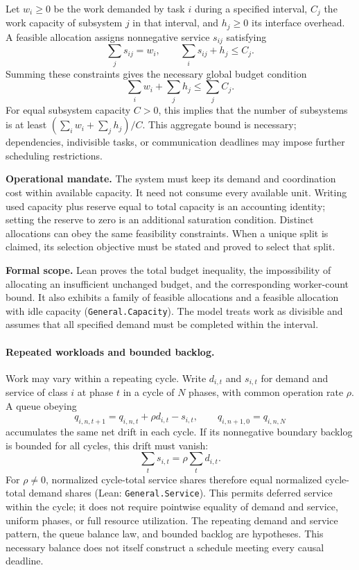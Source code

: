 Let $w_i\geq0$ be the work demanded by task $i$ during a specified interval, $C_j$ the work capacity of subsystem $j$ in that interval, and $h_j\geq0$ its interface overhead. A feasible allocation assigns nonnegative service $s_{ij}$ satisfying
\begin{equation}
    \sum_j s_{ij}=w_i,
    \qquad
    \sum_i s_{ij}+h_j\leq C_j.
\end{equation}
Summing these constraints gives the necessary global budget condition
\begin{equation}
    \sum_i w_i+\sum_j h_j\leq\sum_j C_j.
\end{equation}
For equal subsystem capacity $C>0$, this implies that the number of subsystems is at least $(\sum_iw_i+\sum_jh_j)/C$. This aggregate bound is necessary; dependencies, indivisible tasks, or communication deadlines may impose further scheduling restrictions.

\textbf{Operational mandate.} The system must keep its demand and coordination cost within available capacity. It need not consume every available unit. Writing used capacity plus reserve equal to total capacity is an accounting identity; setting the reserve to zero is an additional saturation condition. Distinct allocations can obey the same feasibility constraints. When a unique split is claimed, its selection objective must be stated and proved to select that split.

\textbf{Formal scope.} Lean proves the total budget inequality, the impossibility of allocating an insufficient unchanged budget, and the corresponding worker-count bound. It also exhibits a family of feasible allocations and a feasible allocation with idle capacity (\texttt{General.Capacity}). The model treats work as divisible and assumes that all specified demand must be completed within the interval.

\paragraph{Repeated workloads and bounded backlog.}
Work may vary within a repeating cycle. Write $d_{i,t}$ and $s_{i,t}$ for demand
and service of class $i$ at phase $t$ in a cycle of $N$ phases, with common
operation rate $\rho$. A queue obeying
\begin{equation}
 q_{i,n,t+1}=q_{i,n,t}+\rho d_{i,t}-s_{i,t},\qquad
 q_{i,n+1,0}=q_{i,n,N}
\end{equation}
accumulates the same net drift in each cycle. If its nonnegative boundary backlog
is bounded for all cycles, this drift must vanish:
\begin{equation}
 \sum_t s_{i,t}=\rho\sum_t d_{i,t}.
\end{equation}
For $\rho\ne0$, normalized cycle-total service shares therefore equal normalized
cycle-total demand shares (Lean: \texttt{General.Service}). This permits deferred
service within the cycle; it does not require pointwise equality of demand and
service, uniform phases, or full resource utilization. The repeating demand and
service pattern, the queue balance law, and bounded backlog are hypotheses.
This necessary balance does not itself construct a schedule meeting every
causal deadline.

